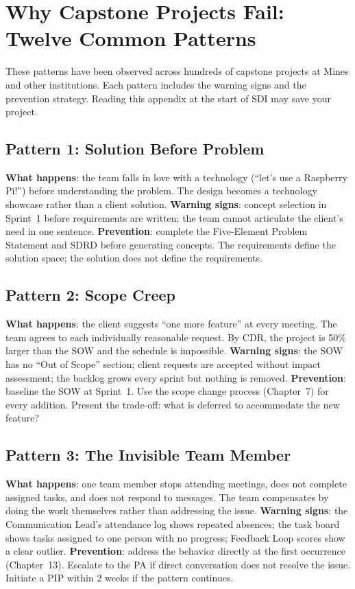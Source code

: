 \chapter{Why Capstone Projects Fail: Twelve Common Patterns}

These patterns have been observed across hundreds of capstone projects at Mines and other institutions. Each pattern includes the warning signs and the prevention strategy. Reading this appendix at the start of SDI may save your project.

\section*{Pattern 1: Solution Before Problem}
\textbf{What happens}: the team falls in love with a technology (``let's use a Raspberry Pi!'') before understanding the problem. The design becomes a technology showcase rather than a client solution.
\textbf{Warning signs}: concept selection in Sprint~1 before requirements are written; the team cannot articulate the client's need in one sentence.
\textbf{Prevention}: complete the Five-Element Problem Statement and SDRD before generating concepts. The requirements define the solution space; the solution does not define the requirements.

\section*{Pattern 2: Scope Creep}
\textbf{What happens}: the client suggests ``one more feature'' at every meeting. The team agrees to each individually reasonable request. By CDR, the project is 50\% larger than the SOW and the schedule is impossible.
\textbf{Warning signs}: the SOW has no ``Out of Scope'' section; client requests are accepted without impact assessment; the backlog grows every sprint but nothing is removed.
\textbf{Prevention}: baseline the SOW at Sprint~1. Use the scope change process (Chapter~7) for every addition. Present the trade-off: what is deferred to accommodate the new feature?

\section*{Pattern 3: The Invisible Team Member}
\textbf{What happens}: one team member stops attending meetings, does not complete assigned tasks, and does not respond to messages. The team compensates by doing the work themselves rather than addressing the issue.
\textbf{Warning signs}: the Communication Lead's attendance log shows repeated absences; the task board shows tasks assigned to one person with no progress; Feedback Loop scores show a clear outlier.
\textbf{Prevention}: address the behavior directly at the first occurrence (Chapter~13). Escalate to the PA if direct conversation does not resolve the issue. Initiate a PIP within 2 weeks if the pattern continues.

